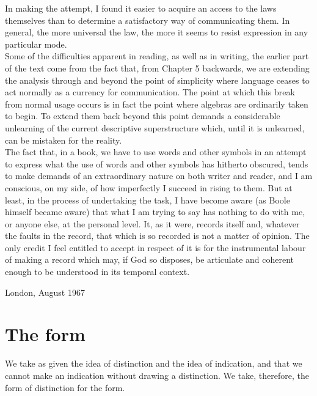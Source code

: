 \documentclass[a4paper]{article}
\theoremstyle{remark}
\begin{document}
In  making  the  attempt,  I  found  it  easier  to  acquire  an  access  to  the  laws  themselves  than  to  determine  a  satisfactory   way   of  communicating   them.  In   general,  the  more   universal   the   law,  the  more  it  seems  to  resist  expression  in  any  particular  mode. \\

Some  of  the  difficulties   apparent   in  reading,  as  well  as  in  writing, the earlier  part  of the  text come  from  the  fact  that,  from  Chapter   5  backwards,  we  are  extending  the  analysis   through   and  beyond  the  point  of  simplicity  where  language  ceases  to  act  normally  as  a  currency  for  communication.  The  point   at   which  this  break  from  normal  usage  occurs  is  in  fact  the  point  where  algebras  are  ordinarily  taken  to  begin.  To  extend  them  back  beyond  this  point  demands  a  considerable  unlearning  of  the current descriptive superstructure which, until  it is unlearned, can  be  mistaken  for  the  reality. \\

The fact that, in a book, we have to use words and other symbols in an attempt to express what the use of words and other symbols has hitherto
 obscured,  tends  to  make  demands  of  an  extraordinary  nature  on  both  writer  and  reader,  and   I   am  conscious,  on  my  side,  of  how  imperfectly   I  succeed   in   rising  to  them.  But  at  least,  in  the  process  of  undertaking  the  task,  I  have  become  aware  (as  Boole  himself  became  aware)  that  what  I  am  trying  to  say  has  nothing  to  do  with  me,  or  anyone  else,  at  the  personal  level.  It,  as  it  were,  records  itself  and,  whatever  the  faults  in  the  record,  that  which is  so  recorded  is not a matter of opinion. The only credit  I  feel entitled to  accept  in  respect  of it is for  the instrumental  labour  of making  a  record  which may, if God so disposes, be articulate and coherent  enough  to  be  understood  in  its temporal  context.

London, August 1967

\newpage
\section{The form}
We take as given the idea of distinction and the idea of indication, and that we cannot make an indication without drawing a distinction. We take, therefore, the form of distinction for the form.
\end{document}
